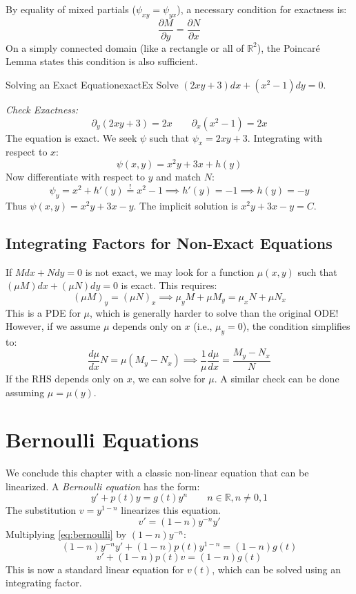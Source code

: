 \documentclass{book}
\newcommand{\R}{{\mathbb{R}}}
\begin{document}
By equality of mixed partials ($\psi_{xy} = \psi_{yx}$), a necessary condition for exactness is:
\begin{equation}\label{eq:exactCondition}
    \frac{\partial M}{\partial y} = \frac{\partial N}{\partial x}
\end{equation}
On a simply connected domain (like a rectangle or all of $\R^2$), the Poincaré Lemma states this condition is also sufficient.

\begin{example}{Solving an Exact Equation}{exactEx}
    Solve $(2xy + 3)dx + (x^2 - 1)dy = 0$.

    \emph{Check Exactness:}
    \[
        \partial_y (2xy + 3) = 2x \qquad \partial_x (x^2 - 1) = 2x
    \]
    The equation is exact. We seek $\psi$ such that $\psi_x = 2xy + 3$. Integrating with respect to $x$:
    \[
        \psi(x,y) = x^2y + 3x + h(y)
    \]
    Now differentiate with respect to $y$ and match $N$:
    \[
        \psi_y = x^2 + h'(y) \overset{!}{=} x^2 - 1 \implies h'(y) = -1 \implies h(y) = -y
    \]
    Thus $\psi(x,y) = x^2y + 3x - y$. The implicit solution is $x^2y + 3x - y = C$.
\end{example}

\subsection*{Integrating Factors for Non-Exact Equations}
If $M dx + N dy = 0$ is not exact, we may look for a function $\mu(x,y)$ such that $(\mu M) dx + (\mu N) dy = 0$ is exact. This requires:
\[
    (\mu M)_y = (\mu N)_x \implies \mu_y M + \mu M_y = \mu_x N + \mu N_x
\]
This is a PDE for $\mu$, which is generally harder to solve than the original ODE! However, if we assume $\mu$ depends only on $x$ (i.e., $\mu_y = 0$), the condition simplifies to:
\[
    \frac{d\mu}{dx} N = \mu (M_y - N_x) \implies \frac{1}{\mu}\frac{d\mu}{dx} = \frac{M_y - N_x}{N}
\]
If the RHS depends only on $x$, we can solve for $\mu$. A similar check can be done assuming $\mu = \mu(y)$.

\section{Bernoulli Equations}

We conclude this chapter with a classic non-linear equation that can be linearized. A \emph{Bernoulli equation} has the form:
\begin{equation}\label{eq:bernoulli}
    y' + p(t)y = g(t)y^n \qquad n \in \R, n \ne 0, 1
\end{equation}
The substitution $v = y^{1-n}$ linearizes this equation.
\[
    v' = (1-n)y^{-n}y'
\]
Multiplying \eqref{eq:bernoulli} by $(1-n)y^{-n}$:
\[
    (1-n)y^{-n}y' + (1-n)p(t)y^{1-n} = (1-n)g(t)
\]
\[
    v' + (1-n)p(t)v = (1-n)g(t)
\]
This is now a standard linear equation for $v(t)$, which can be solved using an integrating factor.
\end{document}
